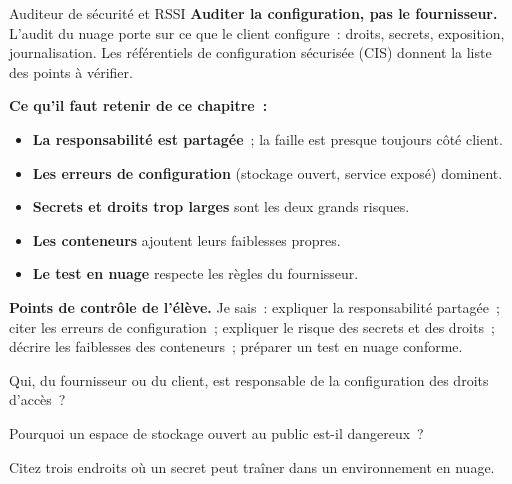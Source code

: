 \begin{boxmetier}{Auditeur de sécurité et RSSI}
\textbf{Auditer la configuration, pas le fournisseur.} L'audit du nuage
porte sur ce que le client configure~: droits, secrets, exposition,
journalisation. Les référentiels de configuration sécurisée (CIS) donnent la
liste des points à vérifier.
\end{boxmetier}

\separateur

\begin{boxresume}
\textbf{Ce qu'il faut retenir de ce chapitre~:}
\begin{itemize}
    \item \textbf{La responsabilité est partagée}~; la faille est presque
          toujours côté client.
    \item \textbf{Les erreurs de configuration} (stockage ouvert, service
          exposé) dominent.
    \item \textbf{Secrets et droits trop larges} sont les deux grands
          risques.
    \item \textbf{Les conteneurs} ajoutent leurs faiblesses propres.
    \item \textbf{Le test en nuage} respecte les règles du fournisseur.
\end{itemize}
\end{boxresume}

\begin{boxinfo}
\textbf{Points de contrôle de l'élève.} Je sais~: expliquer la
responsabilité partagée~; citer les erreurs de configuration~; expliquer le
risque des secrets et des droits~; décrire les faiblesses des conteneurs~;
préparer un test en nuage conforme.
\end{boxinfo}

\bigskip

\begin{boxexo}[title={\ding{45}\quad Exercice~17.1. Frontière \niveaubase}]
Qui, du fournisseur ou du client, est responsable de la configuration des
droits d'accès~?
\end{boxexo}

\begin{boxexo}[title={\ding{45}\quad Exercice~17.2. Stockage ouvert \niveaubase}]
Pourquoi un espace de stockage ouvert au public est-il dangereux~?
\end{boxexo}

\begin{boxexo}[title={\ding{45}\quad Exercice~17.3. Secret \niveaubase}]
Citez trois endroits où un secret peut traîner dans un environnement en
nuage.
\end{boxexo}

